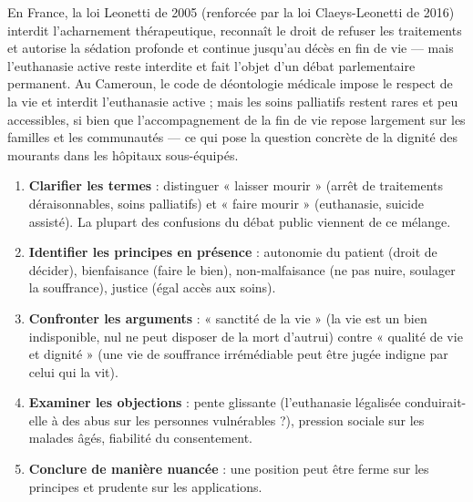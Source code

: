 \documentclass[11pt]{article}
\begin{document}
\begin{exemplebox}
En France, la loi Leonetti de 2005 (renforcée par la loi Claeys-Leonetti de 2016) interdit l'acharnement thérapeutique, reconnaît le droit de refuser les traitements et autorise la sédation profonde et continue jusqu'au décès en fin de vie — mais l'euthanasie active reste interdite et fait l'objet d'un débat parlementaire permanent. Au Cameroun, le code de déontologie médicale impose le respect de la vie et interdit l'euthanasie active ; mais les soins palliatifs restent rares et peu accessibles, si bien que l'accompagnement de la fin de vie repose largement sur les familles et les communautés — ce qui pose la question concrète de la dignité des mourants dans les hôpitaux sous-équipés.
\end{exemplebox}

\begin{methode}
\begin{enumerate}
\item \textbf{Clarifier les termes} : distinguer « laisser mourir » (arrêt de traitements déraisonnables, soins palliatifs) et « faire mourir » (euthanasie, suicide assisté). La plupart des confusions du débat public viennent de ce mélange.
\item \textbf{Identifier les principes en présence} : autonomie du patient (droit de décider), bienfaisance (faire le bien), non-malfaisance (ne pas nuire, soulager la souffrance), justice (égal accès aux soins).
\item \textbf{Confronter les arguments} : « sanctité de la vie » (la vie est un bien indisponible, nul ne peut disposer de la mort d'autrui) contre « qualité de vie et dignité » (une vie de souffrance irrémédiable peut être jugée indigne par celui qui la vit).
\item \textbf{Examiner les objections} : pente glissante (l'euthanasie légalisée conduirait-elle à des abus sur les personnes vulnérables ?), pression sociale sur les malades âgés, fiabilité du consentement.
\item \textbf{Conclure de manière nuancée} : une position peut être ferme sur les principes et prudente sur les applications.
\end{enumerate}
\end{methode}
\end{document}
